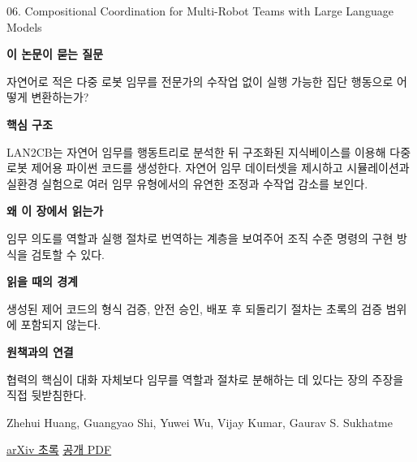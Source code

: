 \documentclass[11pt,openany]{book}
\begin{document}
\begin{termcard}{06. Compositional Coordination for Multi-Robot Teams with Large Language Models}

\par

\medskip

{\sffamily\bfseries\color{deepblue} 이 논문이 묻는 질문}\par

자연어로 적은 다중 로봇 임무를 전문가의 수작업 없이 실행 가능한 집단 행동으로 어떻게 변환하는가?

\smallskip

{\sffamily\bfseries\color{deepblue} 핵심 구조}\par

LAN2CB는 자연어 임무를 행동트리로 분석한 뒤 구조화된 지식베이스를 이용해 다중 로봇 제어용 파이썬 코드를 생성한다. 자연어 임무 데이터셋을 제시하고 시뮬레이션과 실환경 실험으로 여러 임무 유형에서의 유연한 조정과 수작업 감소를 보인다.

\smallskip

{\sffamily\bfseries\color{deepblue} 왜 이 장에서 읽는가}\par

임무 의도를 역할과 실행 절차로 번역하는 계층을 보여주어 조직 수준 명령의 구현 방식을 검토할 수 있다.

\smallskip

{\sffamily\bfseries\color{coral} 읽을 때의 경계}\par

생성된 제어 코드의 형식 검증, 안전 승인, 배포 후 되돌리기 절차는 초록의 검증 범위에 포함되지 않는다.

\smallskip

{\sffamily\bfseries\color{teal} 원책과의 연결}\par

협력의 핵심이 대화 자체보다 임무를 역할과 절차로 분해하는 데 있다는 장의 주장을 직접 뒷받침한다.

\medskip

{\footnotesize\color{muted} Zhehui Huang, Guangyao Shi, Yuwei Wu, Vijay Kumar, Gaurav S. Sukhatme\par

\href{https://arxiv.org/abs/2507.16068}{arXiv 초록} \quad \href{https://arxiv.org/pdf/2507.16068}{공개 PDF}\par}

\end{termcard}
\end{document}
